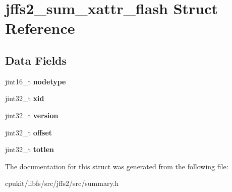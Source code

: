 \hypertarget{structjffs2__sum__xattr__flash}{}\section{jffs2\+\_\+sum\+\_\+xattr\+\_\+flash Struct Reference}
\label{structjffs2__sum__xattr__flash}
\subsection*{Data Fields}
\begin{DoxyCompactItemize}
\item 
\mbox{\label{structjffs2__sum__xattr__flash_a794ac473b2f24f75dd5429e2225b1365}} 
jint16\+\_\+t {\bfseries nodetype}
\item 
\mbox{\label{structjffs2__sum__xattr__flash_a05cd9402075f1b9fbf6511c78a412b34}} 
jint32\+\_\+t {\bfseries xid}
\item 
\mbox{\label{structjffs2__sum__xattr__flash_a9f440f3297a1e7941875a5bfe9e1cca9}} 
jint32\+\_\+t {\bfseries version}
\item 
\mbox{\label{structjffs2__sum__xattr__flash_aa4e61842ad67f1af09d868edfff276ec}} 
jint32\+\_\+t {\bfseries offset}
\item 
\mbox{\label{structjffs2__sum__xattr__flash_a13e9fd30429f58838b6997a0a3e7d4e1}} 
jint32\+\_\+t {\bfseries totlen}
\end{DoxyCompactItemize}


The documentation for this struct was generated from the following file\+:\begin{DoxyCompactItemize}
\item 
cpukit/libfs/src/jffs2/src/summary.\+h\end{DoxyCompactItemize}
